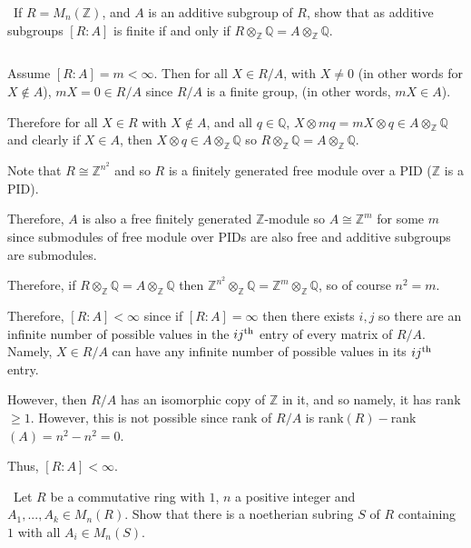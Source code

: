 \documentclass[12pt]{AlgebraQual}
\begin{document}
\begin{problem} $\,$
If $R=M_n(\mathbb{Z})$, and $A$ is an additive subgroup of $R$, show that as additive subgroups $[R:A]$ is finite if and only if $R\otimes_\mathbb{Z}\mathbb{Q}=A\otimes_\mathbb{Z}\mathbb{Q}.$
\end{problem}


\begin{solution}$\,$

\boxed{\implies} Assume $[R:A]=m<\infty$. Then for all $X\in R/A$, with $X\not=0$ (in other words for $X\notin A$), $mX=0\in R/A$ since $R/A$ is a finite group, (in other words, $mX\in A$).

Therefore for all $X\in R$ with $X\notin A$, and all $q\in\mathbb{Q}$, $X\otimes mq=mX\otimes q\in A\otimes_\mathbb{Z}\mathbb{Q}$ and clearly if $X\in A$, then $X\otimes q\in A\otimes_\mathbb{Z}\mathbb{Q}$ so $R\otimes_\mathbb{Z}\mathbb{Q}=A\otimes_\mathbb{Z}\mathbb{Q}$.

\boxed{\impliedby} Note that $R\cong\mathbb{Z}^{n^2}$ and so $R$ is a finitely generated free module over a PID ($\mathbb{Z}$ is a PID).

Therefore, $A$ is also a free finitely generated $\mathbb{Z}$-module so $A\cong\mathbb{Z}^m$ for some $m$ since submodules of free module over PIDs are also free and additive subgroups are submodules.

Therefore, if $R\otimes_\mathbb{Z}\mathbb{Q}=A\otimes_\mathbb{Z}\mathbb{Q}$ then $\mathbb{Z}^{n^2}\otimes_\mathbb{Z}\mathbb{Q}=\mathbb{Z}^m\otimes_\mathbb{Z}\mathbb{Q}$, so of course $n^2=m$.

Therefore, $[R:A]<\infty$ since if $[R:A]=\infty$ then there exists $i,j$ so there are an infinite number of possible values in the $ij^\text{th}$ entry of every matrix of $R/A$. Namely, $X\in R/A$ can have any infinite number of possible values in its $ij^\text{th}$ entry.

However, then $R/A$ has an isomorphic copy of $\mathbb{Z}$ in it, and so namely, it has rank $\ge1$. However, this is not possible since rank of $R/A$ is rank$(R)-$rank$(A)=n^2-n^2=0$.

Thus, $[R:A]<\infty.$
\end{solution}
\newpage


\begin{problem} $\,$
Let $R$ be a commutative ring with $1$, $n$ a positive integer and $A_1,...,A_k\in M_n(R)$. Show that there is a noetherian subring $S$ of $R$ containing $1$ with all $A_i\in M_n(S).$
\end{problem}
\end{document}
